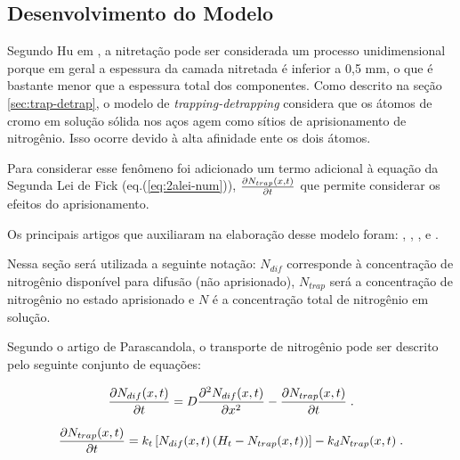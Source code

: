 \subsection{Desenvolvimento do Modelo}
\label{sec:trap-detrap-desenvolvimento}
Segundo Hu em \cite{hu2000mathematical}, a nitretação pode ser considerada um processo unidimensional porque em geral a espessura da camada nitretada é inferior a 0,5 mm, o que é bastante menor que a espessura total dos componentes.
Como descrito na seção \autoref{sec:trap-detrap}, o modelo de \textit{trapping-detrapping} considera que os átomos de cromo em solução sólida nos aços agem como sítios de aprisionamento de nitrogênio. Isso ocorre devido à alta afinidade ente os dois átomos.

Para considerar esse fenômeno foi adicionado um termo adicional à equação da Segunda Lei de Fick (eq.(\autoref{eq:2alei-num})), $\pdv{N_{trap}(x,t)}{t}$ que permite considerar os efeitos do aprisionamento. 

Os principais artigos que auxiliaram na elaboração desse modelo foram:
\cite{moskalioviene2011modeling}, \cite{parascandola2000nitrogen}, \cite{moller1983pidat}, \cite{peng2018numerical} e \cite{moller2001surface}.  

Nessa seção será utilizada a seguinte notação: $N_{dif}$ corresponde à concentração de nitrogênio disponível para difusão (não aprisionado), $N_{trap}$ será a concentração de nitrogênio no estado aprisionado e $N$ é a concentração total de nitrogênio em solução.

Segundo o artigo de Parascandola, o transporte de nitrogênio pode ser descrito pelo seguinte conjunto de equações:

\begin{equation}
\label{eq:trap-detrap}
\pdv{N_{dif}(x,t)}{t} = D\pdv[2]{N_{dif}(x,t)}{x} - \pdv{N_{trap}(x,t)}{t}  \;.
\end{equation}

\begin{equation}
\label{eq:trap-detrap2}
\pdv{N_{trap}(x,t)}{t} = k_t\left[N_{dif}(x,t)\left(H_t-N_{trap}(x,t)\right)\right] - k_dN_{trap}(x,t) \;.
\end{equation}

